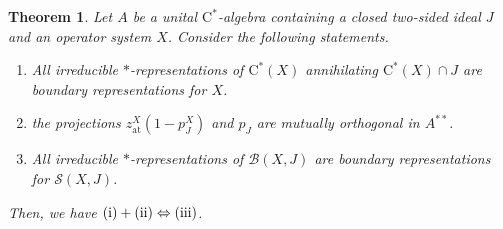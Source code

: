 \documentclass[10pt]{amsart}
\newcommand{\B}{{\mathcal{B}}}
\renewcommand{\S}{{\mathcal{S}}}
\newcommand{\rC}{\mathrm{C}}
\newcommand{\at}{\operatorname{at}}
\newtheorem{theorem}[lemma]{Theorem}
\theoremstyle{definition}
\begin{document}
\begin{theorem}\label{T:projcriterion}
Let $A$ be a unital $\rC^*$-algebra containing a closed two-sided ideal $J$ and an operator system $X$.  
Consider the following statements.
\begin{enumerate}[{\rm (i)}]
\item All irreducible $*$-representations of $\rC^*(X)$ annihilating $ \rC^*(X)\cap J$ are boundary representations for $X$.
\item the projections $z^X_{\at}(1-p^X_J)$ and $p_J$ are mutually orthogonal in $A^{**}$.
\item All irreducible $*$-representations of $\B(X,J)$ are boundary representations for $\S(X,J)$.
\end{enumerate}
Then, we have ${\rm (i)}+{\rm (ii)}\Leftrightarrow {\rm (iii)}$.
\end{theorem}
\end{document}
